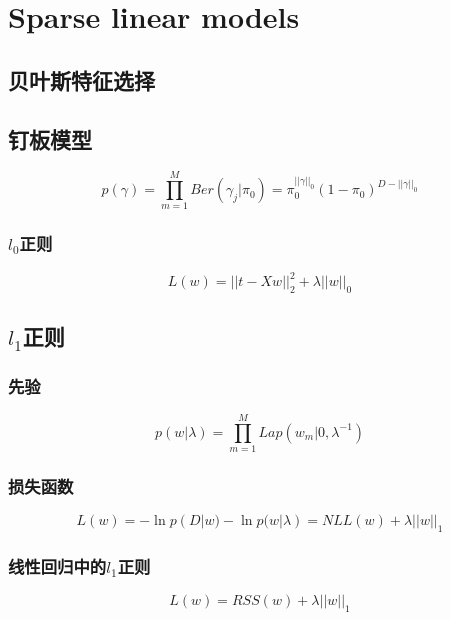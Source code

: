 \chapter{Sparse linear models}

\section{贝叶斯特征选择}
\section{钉板模型}
\begin{equation}
p(\gamma) = \prod_{m=1}^MBer(\gamma_j|\pi_0)
= \pi_0^{||\gamma||_0}(1-\pi_0)^{D-||\gamma||_0}
\end{equation}

\subsection{$l_0$正则}
\begin{equation}
L(w) = ||t - Xw||^2_2 + \lambda||w||_0
\end{equation}

\section{$l_1$正则}
\subsection{先验}
\begin{equation}
p(w|\lambda) = \prod_{m=1}^MLap(w_m|0,\lambda^{-1})
\end{equation}

\subsection{损失函数}
\begin{equation}
L(w) = -\ln p(D|w) - \ln p(w|\lambda) = NLL(w) + \lambda||w||_1
\end{equation}

\subsection{线性回归中的$l_1$正则}
\begin{equation}
L(w) = RSS(w) + \lambda||w||_1
\end{equation}
